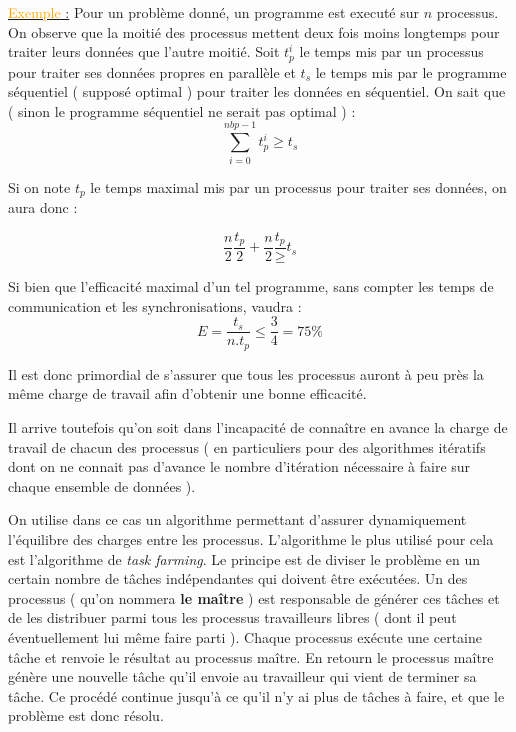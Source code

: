 \documentclass[fleqn,11pt]{article}
\begin{document}
\underline{\textcolor{orange}{Exemple} :} Pour un problème donné, un programme est executé sur $n$ processus. On observe que la moitié des processus
mettent deux fois moins longtemps pour traiter leurs données que l'autre moitié. Soit $t_{p}^{i}$ le temps mis par un processus pour traiter ses données
propres  en parallèle et $t_{s}$ le temps mis par le programme séquentiel ( supposé optimal ) pour traiter les données en séquentiel.
On sait que ( sinon le programme séquentiel ne serait pas optimal ) :
\[
 \sum_{i=0}^{nbp-1} t_{p}^{i} \geq t_{s}
\]

Si on note $t_{p}$ le temps maximal mis par un processus pour traiter ses données, on aura donc :

\[
 \frac{n}{2}\frac{t_{p}}{2} + \frac{n}{2}\frac{t_{p}} \geq t_{s}
\]

Si bien que l'efficacité maximal d'un tel programme, sans compter les temps de communication et les synchronisations,  vaudra :
\[
 E =  \frac{t_{s}}{n.t_{p}} \leq \frac{3}{4} = 75 \%
\]

Il est donc primordial de s'assurer que tous les processus auront à peu près la même charge de travail afin d'obtenir une bonne efficacité.

Il arrive toutefois qu'on soit dans l'incapacité de connaître en avance la charge de travail de chacun des processus ( en particuliers pour des
algorithmes itératifs dont on ne connait pas d'avance le nombre d'itération nécessaire à faire sur chaque ensemble de données ).

On utilise dans ce cas un algorithme permettant d'assurer dynamiquement l'équilibre des charges entre les processus. L'algorithme le plus utilisé
pour cela est l'algorithme de \textsl{task farming}. Le principe est de diviser le problème en un certain nombre de tâches indépendantes
qui doivent être exécutées. Un des processus ( qu'on nommera \textbf{le maître} ) est responsable de générer ces tâches et de les distribuer
parmi tous les processus travailleurs libres ( dont il peut éventuellement lui même faire parti ). Chaque processus exécute une certaine tâche et renvoie
le résultat au processus maître. En retourn le processus maître génère une nouvelle tâche qu'il envoie au travailleur qui vient de terminer
sa tâche. Ce procédé continue jusqu'à ce qu'il n'y ai plus de tâches à faire, et que le problème est donc résolu.
\end{document}

